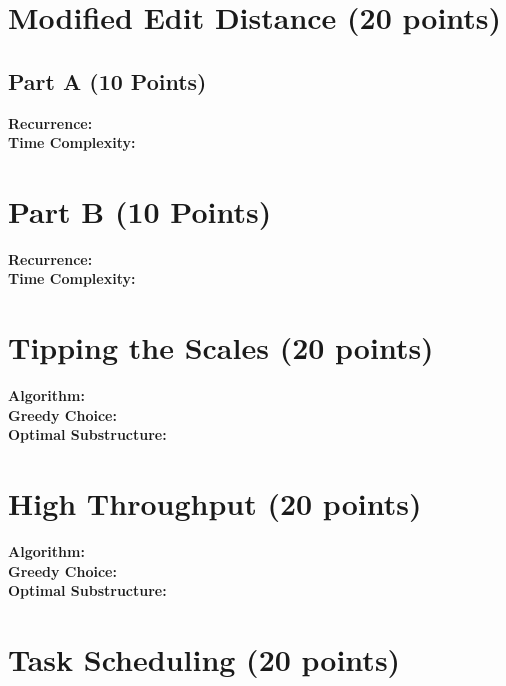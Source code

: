 \documentclass{article}[12pt]
\begin{document}
\newpage
\section{Modified Edit Distance (20 points)}
\subsection{Part A (10 Points)}
\noindent\textbf{Recurrence:} \\
\noindent\textbf{Time Complexity:} \\

\newpage
\section{Part B (10 Points)}
\noindent\textbf{Recurrence:} \\
\noindent\textbf{Time Complexity:} \\

\newpage
\section{Tipping the Scales (20 points)}
\noindent\textbf{Algorithm:} \\
\noindent\textbf{Greedy Choice:} \\
\noindent\textbf{Optimal Substructure:} \\

\newpage
\section{High Throughput (20 points)}
\noindent\textbf{Algorithm:} \\
\noindent\textbf{Greedy Choice:} \\
\noindent\textbf{Optimal Substructure:} \\

\newpage
\section{Task Scheduling (20 points)}
\end{document}
